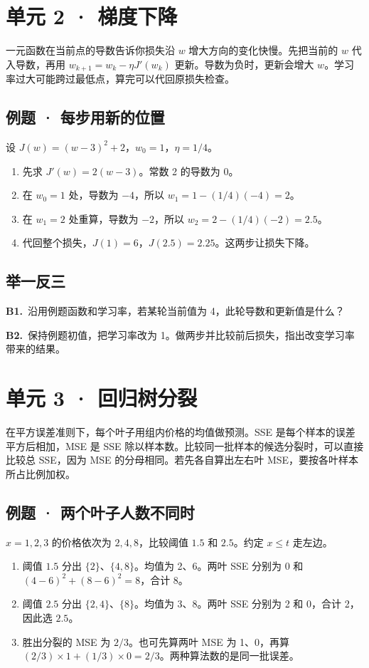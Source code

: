 \documentclass[UTF8,a4paper,11pt]{ctexart}
\newcommand{\PracticeQuestion}[3]{\par\Needspace{4\baselineskip}\noindent\begin{minipage}{\linewidth}\textbf{#1.}\ #2\par\noindent\rule{0pt}{#3mm}\par\end{minipage}\par}
\begin{document}
\section{单元 2 · 梯度下降}
一元函数在当前点的导数告诉你损失沿 $w$ 增大方向的变化快慢。先把当前的 $w$ 代入导数，再用 $w_{k+1}=w_k-\eta J'(w_k)$ 更新。导数为负时，更新会增大 $w$。学习率过大可能跨过最低点，算完可以代回原损失检查。

\subsection{例题 · 每步用新的位置}
设 $J(w)=(w-3)^2+2$，$w_0=1$，$\eta=1/4$。

\begin{enumerate}
\item 先求 $J'(w)=2(w-3)$。常数 2 的导数为 0。
\item 在 $w_0=1$ 处，导数为 $-4$，所以 $w_1=1-(1/4)(-4)=2$。
\item 在 $w_1=2$ 处重算，导数为 $-2$，所以 $w_2=2-(1/4)(-2)=2.5$。
\item 代回整个损失，$J(1)=6$，$J(2.5)=2.25$。这两步让损失下降。
\end{enumerate}
\subsection{举一反三}
\PracticeQuestion{B1}{沿用例题函数和学习率，若某轮当前值为 4，此轮导数和更新值是什么？}{24}
\PracticeQuestion{B2}{保持例题初值，把学习率改为 1。做两步并比较前后损失，指出改变学习率带来的结果。}{34}
\clearpage
\section{单元 3 · 回归树分裂}
在平方误差准则下，每个叶子用组内价格的均值做预测。SSE 是每个样本的误差平方后相加，MSE 是 SSE 除以样本数。比较同一批样本的候选分裂时，可以直接比较总 SSE，因为 MSE 的分母相同。若先各自算出左右叶 MSE，要按各叶样本所占比例加权。

\subsection{例题 · 两个叶子人数不同时}
$x=1,2,3$ 的价格依次为 $2,4,8$，比较阈值 $1.5$ 和 $2.5$。约定 $x\le t$ 走左边。

\begin{enumerate}
\item 阈值 $1.5$ 分出 $\{2\}$、$\{4,8\}$。均值为 2、6。两叶 SSE 分别为 0 和 $(4-6)^2+(8-6)^2=8$，合计 8。
\item 阈值 $2.5$ 分出 $\{2,4\}$、$\{8\}$。均值为 3、8。两叶 SSE 分别为 2 和 0，合计 2，因此选 $2.5$。
\item 胜出分裂的 MSE 为 $2/3$。也可先算两叶 MSE 为 1、0，再算 $(2/3)\times1+(1/3)\times0=2/3$。两种算法数的是同一批误差。
\end{enumerate}
\end{document}
